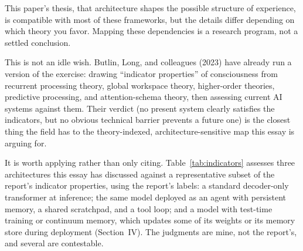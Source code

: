 \documentclass[11pt,letterpaper]{article}
\begin{document}
This paper's thesis, that architecture shapes the possible structure of experience, is compatible with most of these frameworks, but the details differ depending on which theory you favor. Mapping these dependencies is a research program, not a settled conclusion.

This is not an idle wish. Butlin, Long, and colleagues (2023) have already run a version of the exercise: drawing ``indicator properties'' of consciousness from recurrent processing theory, global workspace theory, higher-order theories, predictive processing, and attention-schema theory, then assessing current AI systems against them. Their verdict (no present system clearly satisfies the indicators, but no obvious technical barrier prevents a future one) is the closest thing the field has to the theory-indexed, architecture-sensitive map this essay is arguing for.

It is worth applying rather than only citing. Table~\ref{tab:indicators} assesses three architectures this essay has discussed against a representative subset of the report's indicator properties, using the report's labels: a standard decoder-only transformer at inference; the same model deployed as an agent with persistent memory, a shared scratchpad, and a tool loop; and a model with test-time training or continuum memory, which updates some of its weights or its memory store during deployment (Section~IV). The judgments are mine, not the report's, and several are contestable.
\end{document}
